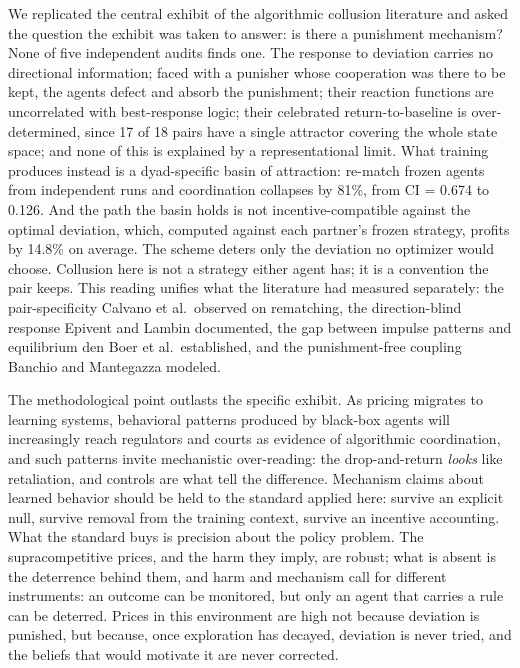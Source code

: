 \documentclass[sigconf]{acmart}
\begin{document}
We replicated the central exhibit of the algorithmic collusion
literature and asked the question the exhibit was taken to answer: is
there a punishment mechanism? None of five independent audits finds one.
The response to deviation carries no directional information; faced with
a punisher whose cooperation was there to be kept, the agents defect and
absorb the punishment; their reaction functions are uncorrelated with
best-response logic; their celebrated return-to-baseline is
over-determined, since 17 of 18 pairs have a single attractor covering
the whole state space; and none of this is explained by a
representational limit. What training produces instead is a
dyad-specific basin of attraction: re-match frozen agents from
independent runs and coordination collapses by 81\%, from CI = 0.674 to
0.126. And the path the basin holds is not incentive-compatible against
the optimal deviation, which, computed against each partner's frozen
strategy, profits by 14.8\% on average. The scheme deters only the
deviation no optimizer would choose. Collusion here is not a strategy
either agent has; it is a convention the pair keeps. This reading
unifies what the literature had measured separately: the
pair-specificity Calvano et al.~observed on rematching, the
direction-blind response Epivent and Lambin documented, the gap between
impulse patterns and equilibrium den Boer et al.~established, and the
punishment-free coupling Banchio and Mantegazza modeled.

The methodological point outlasts the specific exhibit. As pricing
migrates to learning systems, behavioral patterns produced by black-box
agents will increasingly reach regulators and courts as evidence of
algorithmic coordination, and such patterns invite mechanistic
over-reading: the drop-and-return \emph{looks} like retaliation, and
controls are what tell the difference. Mechanism claims about learned
behavior should be held to the standard applied here: survive an
explicit null, survive removal from the training context, survive an
incentive accounting. What the standard buys is precision about the
policy problem. The supracompetitive prices, and the harm they imply,
are robust; what is absent is the deterrence behind them, and harm and
mechanism call for different instruments: an outcome can be monitored,
but only an agent that carries a rule can be deterred. Prices in this
environment are high not because deviation is punished, but because,
once exploration has decayed, deviation is never tried, and the beliefs
that would motivate it are never corrected.



\end{document}
